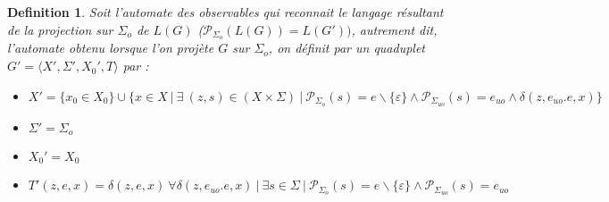 \documentclass{article}
\newtheorem{mydef}{Definition}
\newcounter{ex}[section]
\begin{document}
\begin{mydef}
Soit l'automate des observables qui reconnait le langage r\'esultant de la projection sur $\Sigma_o$ de $L(G)$ ($\mathscr{P}_{\Sigma_o}(L(G))=L(G'))$, autrement dit, l'automate obtenu lorsque l'on proj\`ete $G$ sur $\Sigma_o$, on d\'efinit par un quaduplet $G'=\langle X', \Sigma', X_0', T \rangle$ par :
\begin{itemize}
\item $X'=\{x_0 \in X_0\} \cup \{x \in X \  | \ \exists\  (z,s) \in (X \times \Sigma)\  |\  \mathscr{P}_{\Sigma_o}(s)=e \backslash \{\varepsilon\} \wedge  \mathscr{P}_{\Sigma_{uo}}(s)=e_{uo} \wedge \delta(z, e_{uo}.e, x)\}$
\item $\Sigma'=\Sigma_o$
\item $X_0'=X_0$
\item $T'(z,e,x)=\delta(z,e,x)\ \forall \delta(z, e_{uo}.e,x)\ | \ \exists s \in \Sigma \ | \ \mathscr{P}_{\Sigma_o}(s)=e \backslash \{\varepsilon\} \wedge  \mathscr{P}_{\Sigma_{uo}}(s)=e_{uo}$
\end{itemize}
\end{mydef}
\end{document}
